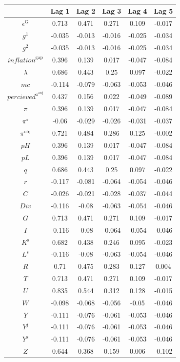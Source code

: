\begin{tabular}{c|ccccc|}
  & Lag 1 & Lag 2 & Lag 3 & Lag 4 & Lag 5\\
\hline
$\epsilon^{\mathrm{G}}$ & 0.713 & 0.471 & 0.271 & 0.109 & -0.017 \\
$g^{\mathrm{1}}$ & -0.035 & -0.013 & -0.016 & -0.025 & -0.034 \\
$g^{\mathrm{2}}$ & -0.035 & -0.013 & -0.016 & -0.025 & -0.034 \\
${i\!n\!f\!l\!a\!t\!i\!o\!n}^{\mathrm{gap}}$ & 0.396 & 0.139 & 0.017 & -0.047 & -0.084 \\
$\lambda$ & 0.686 & 0.443 & 0.25 & 0.097 & -0.022 \\
${m\!c}$ & -0.114 & -0.079 & -0.063 & -0.053 & -0.046 \\
${p\!e\!r\!c\!i\!e\!v\!e\!d}^{\pi^{\mathrm{obj}}}$ & 0.437 & 0.156 & 0.022 & -0.049 & -0.089 \\
$\pi$ & 0.396 & 0.139 & 0.017 & -0.047 & -0.084 \\
$\pi^{\star}$ & -0.06 & -0.029 & -0.026 & -0.031 & -0.037 \\
$\pi^{\mathrm{obj}}$ & 0.721 & 0.484 & 0.286 & 0.125 & -0.002 \\
${p\!H}$ & 0.396 & 0.139 & 0.017 & -0.047 & -0.084 \\
${p\!L}$ & 0.396 & 0.139 & 0.017 & -0.047 & -0.084 \\
$q$ & 0.686 & 0.443 & 0.25 & 0.097 & -0.022 \\
$r$ & -0.117 & -0.081 & -0.064 & -0.054 & -0.046 \\
$C$ & -0.026 & -0.021 & -0.028 & -0.037 & -0.044 \\
${D\!i\!v}$ & -0.116 & -0.08 & -0.063 & -0.054 & -0.046 \\
$G$ & 0.713 & 0.471 & 0.271 & 0.109 & -0.017 \\
$I$ & -0.116 & -0.08 & -0.064 & -0.054 & -0.046 \\
$K^{\mathrm{s}}$ & 0.682 & 0.438 & 0.246 & 0.095 & -0.023 \\
$L^{\mathrm{s}}$ & -0.116 & -0.08 & -0.063 & -0.054 & -0.046 \\
$R$ & 0.71 & 0.475 & 0.283 & 0.127 & 0.004 \\
$T$ & 0.713 & 0.471 & 0.271 & 0.109 & -0.017 \\
$U$ & 0.835 & 0.544 & 0.312 & 0.128 & -0.015 \\
$W$ & -0.098 & -0.068 & -0.056 & -0.05 & -0.046 \\
$Y$ & -0.111 & -0.076 & -0.061 & -0.053 & -0.046 \\
$Y^{\mathrm{j}}$ & -0.111 & -0.076 & -0.061 & -0.053 & -0.046 \\
$Y^{\mathrm{s}}$ & -0.111 & -0.076 & -0.061 & -0.053 & -0.046 \\
$Z$ & 0.644 & 0.368 & 0.159 & 0.006 & -0.102 \\
\hline
\end{tabular}


